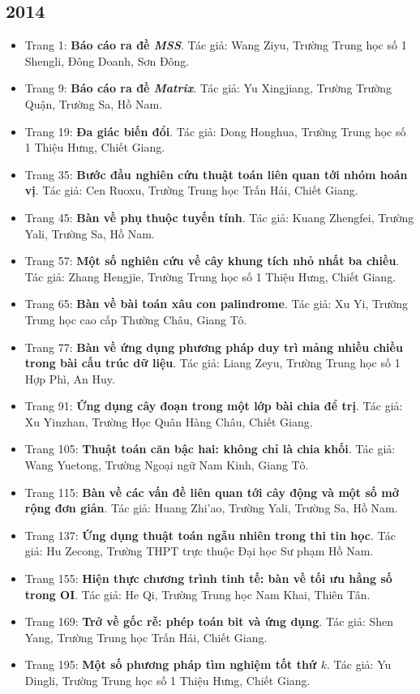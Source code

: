 \documentclass[11pt]{article}
\begin{document}
\subsection{2014}
\begin{itemize}[leftmargin=2em]
  \item Trang 1: \textbf{Báo cáo ra đề \emph{MSS}}. Tác giả: Wang Ziyu, Trường Trung học số 1 Shengli, Đông Doanh, Sơn Đông.
  \item Trang 9: \textbf{Báo cáo ra đề \emph{Matrix}}. Tác giả: Yu Xingjiang, Trường Trường Quận, Trường Sa, Hồ Nam.
  \item Trang 19: \textbf{Đa giác biến đổi}. Tác giả: Dong Honghua, Trường Trung học số 1 Thiệu Hưng, Chiết Giang.
  \item Trang 35: \textbf{Bước đầu nghiên cứu thuật toán liên quan tới nhóm hoán vị}. Tác giả: Cen Ruoxu, Trường Trung học Trấn Hải, Chiết Giang.
  \item Trang 45: \textbf{Bàn về phụ thuộc tuyến tính}. Tác giả: Kuang Zhengfei, Trường Yali, Trường Sa, Hồ Nam.
  \item Trang 57: \textbf{Một số nghiên cứu về cây khung tích nhỏ nhất ba chiều}. Tác giả: Zhang Hengjie, Trường Trung học số 1 Thiệu Hưng, Chiết Giang.
  \item Trang 65: \textbf{Bàn về bài toán xâu con palindrome}. Tác giả: Xu Yi, Trường Trung học cao cấp Thường Châu, Giang Tô.
  \item Trang 77: \textbf{Bàn về ứng dụng phương pháp duy trì mảng nhiều chiều trong bài cấu trúc dữ liệu}. Tác giả: Liang Zeyu, Trường Trung học số 1 Hợp Phì, An Huy.
  \item Trang 91: \textbf{Ứng dụng cây đoạn trong một lớp bài chia để trị}. Tác giả: Xu Yinzhan, Trường Học Quân Hàng Châu, Chiết Giang.
  \item Trang 105: \textbf{Thuật toán căn bậc hai: không chỉ là chia khối}. Tác giả: Wang Yuetong, Trường Ngoại ngữ Nam Kinh, Giang Tô.
  \item Trang 115: \textbf{Bàn về các vấn đề liên quan tới cây động và một số mở rộng đơn giản}. Tác giả: Huang Zhi'ao, Trường Yali, Trường Sa, Hồ Nam.
  \item Trang 137: \textbf{Ứng dụng thuật toán ngẫu nhiên trong thi tin học}. Tác giả: Hu Zecong, Trường THPT trực thuộc Đại học Sư phạm Hồ Nam.
  \item Trang 155: \textbf{Hiện thực chương trình tinh tế: bàn về tối ưu hằng số trong OI}. Tác giả: He Qi, Trường Trung học Nam Khai, Thiên Tân.
  \item Trang 169: \textbf{Trở về gốc rễ: phép toán bit và ứng dụng}. Tác giả: Shen Yang, Trường Trung học Trấn Hải, Chiết Giang.
  \item Trang 195: \textbf{Một số phương pháp tìm nghiệm tốt thứ \(k\)}. Tác giả: Yu Dingli, Trường Trung học số 1 Thiệu Hưng, Chiết Giang.
\end{itemize}
\end{document}
